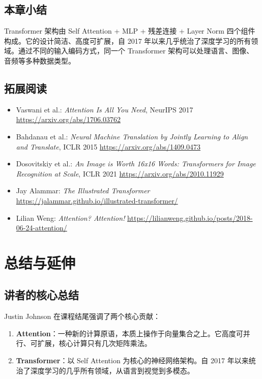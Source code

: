 \documentclass[a4paper]{article}
\begin{document}
\subsection{本章小结}

Transformer 架构由 Self Attention + MLP + 残差连接 + Layer Norm 四个组件构成。它的设计简洁、高度可扩展，自 2017 年以来几乎统治了深度学习的所有领域。通过不同的输入编码方式，同一个 Transformer 架构可以处理语言、图像、音频等多种数据类型。


\subsection{拓展阅读}

\begin{itemize}
    \item Vaswani et al.: \textit{Attention Is All You Need}, NeurIPS 2017 \url{https://arxiv.org/abs/1706.03762}
    \item Bahdanau et al.: \textit{Neural Machine Translation by Jointly Learning to Align and Translate}, ICLR 2015 \url{https://arxiv.org/abs/1409.0473}
    \item Dosovitskiy et al.: \textit{An Image is Worth 16x16 Words: Transformers for Image Recognition at Scale}, ICLR 2021 \url{https://arxiv.org/abs/2010.11929}
    \item Jay Alammar: \textit{The Illustrated Transformer} \url{https://jalammar.github.io/illustrated-transformer/}
    \item Lilian Weng: \textit{Attention? Attention!} \url{https://lilianweng.github.io/posts/2018-06-24-attention/}
\end{itemize}


\section{总结与延伸}

\subsection{讲者的核心总结}

Justin Johnson 在课程结尾强调了两个核心贡献：

\begin{enumerate}
    \item \textbf{Attention}：一种新的计算原语，本质上操作于向量集合之上。它高度可并行、可扩展，核心计算只有几次矩阵乘法。
    \item \textbf{Transformer}：以 Self Attention 为核心的神经网络架构。自 2017 年以来统治了深度学习的几乎所有领域，从语言到视觉到多模态。
\end{enumerate}
\end{document}
